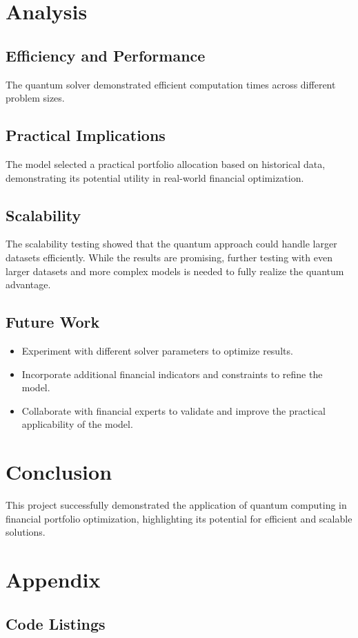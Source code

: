 \documentclass{article}
\begin{document}
\section{Analysis}
\subsection{Efficiency and Performance}
The quantum solver demonstrated efficient computation times across different problem sizes.

\subsection{Practical Implications}
The model selected a practical portfolio allocation based on historical data, demonstrating its potential utility in real-world financial optimization.

\subsection{Scalability}
The scalability testing showed that the quantum approach could handle larger datasets efficiently. While the results are promising, further testing with even larger datasets and more complex models is needed to fully realize the quantum advantage.

\subsection{Future Work}
\begin{itemize}
    \item Experiment with different solver parameters to optimize results.
    \item Incorporate additional financial indicators and constraints to refine the model.
    \item Collaborate with financial experts to validate and improve the practical applicability of the model.
\end{itemize}

\section{Conclusion}
This project successfully demonstrated the application of quantum computing in financial portfolio optimization, highlighting its potential for efficient and scalable solutions.

\section{Appendix}
\subsection{Code Listings}





\end{document}

